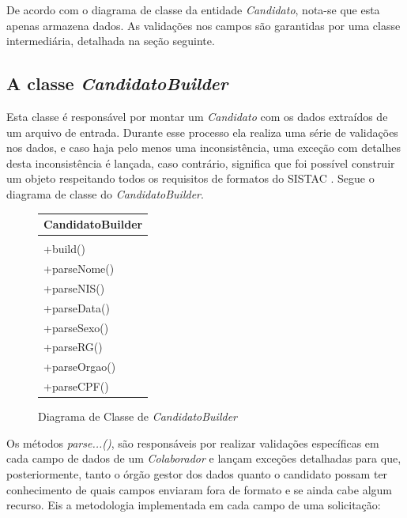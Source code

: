 \documentclass[
	12pt,			%
	openright,		%
	oneside,	
	a4paper,		%
	english,		%
	brazil			%
]{abntex2/abntex2}  %
\begin{document}
				De acordo com o diagrama de classe da entidade \textit{Candidato}, nota-se que esta apenas armazena dados. As validações nos campos são garantidas por uma classe intermediária, detalhada na seção seguinte.
	
			\subsection{A classe \textit{CandidatoBuilder}} \label{candidato-builder}
				
				Esta classe é responsável por montar um \textit{Candidato} com os dados extraídos de um arquivo de entrada. Durante esse processo ela realiza uma série de validações nos dados, e caso haja pelo menos uma inconsistência, uma exceção com detalhes desta inconsistência é lançada, caso contrário, significa que foi possível construir um objeto respeitando todos os requisitos de formatos do SISTAC \cite{sistac-formatos}. Segue o diagrama de classe do \textit{CandidatoBuilder}.
				
				\begin{figure}[ht]
					\begin{center}
						
						\caption{Diagrama de Classe de \textit{CandidatoBuilder}}
						
						\begin{tabular}{|l|}
							\hline
							\multicolumn{1}{|c|}{\textbf{CandidatoBuilder}} \\ \hline
							\\ \hline
							+build() \\
							+parseNome() \\
							+parseNIS() \\
							+parseData() \\
							+parseSexo() \\
							+parseRG() \\
							+parseOrgao() \\
							+parseCPF() \\ \hline
						\end{tabular}
					
					\end{center}
				\end{figure}
	
				Os métodos \textit{parse...()}, são responsáveis por realizar validações específicas em cada campo de dados de um \textit{Colaborador} e lançam exceções detalhadas para que, posteriormente, tanto o órgão gestor dos dados quanto o candidato possam ter conhecimento de quais campos enviaram fora de formato e se ainda cabe algum recurso. Eis a metodologia implementada em cada campo de uma solicitação:
				
\end{document}
